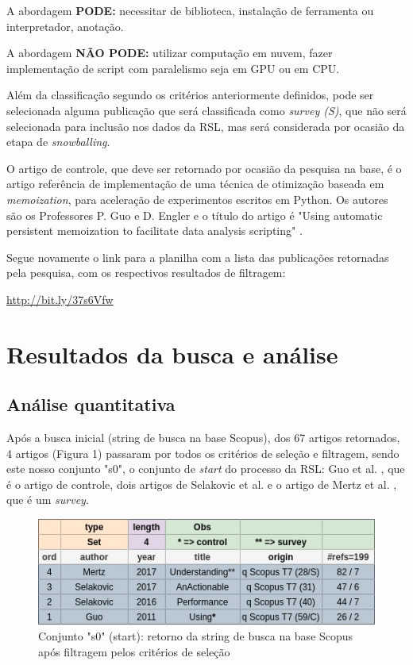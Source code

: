 \documentclass[sigconf]{acmart}
\begin{document}
A abordagem \textbf{PODE:} necessitar de biblioteca, instalação de ferramenta ou interpretador, anotação.

A abordagem \textbf{NÃO PODE:} utilizar computação em nuvem, fazer implementação de script com paralelismo seja em GPU ou em CPU.

Além da classificação segundo os critérios anteriormente definidos, pode ser selecionada alguma publicação que será classificada como \textit{survey (S)}, que não será selecionada para inclusão nos dados da RSL, mas será considerada por ocasião da etapa de \textit{snowballing}.

O artigo de controle, que deve ser retornado por ocasião da pesquisa na base, é o artigo referência de implementação de uma técnica de otimização baseada em \textit{memoization}, para aceleração de experimentos escritos em Python. Os autores são os Professores P. Guo e D. Engler e o título do artigo é "Using automatic persistent memoization to facilitate data analysis scripting" \cite{guo2011using}.

Segue novamente o link para a planilha com a lista das publicações retornadas pela pesquisa, com os respectivos resultados de filtragem:

\url{http://bit.ly/37s6Vfw}


\section{Resultados da busca e análise}
\subsection{Análise quantitativa}
Após a busca inicial (string de busca na base Scopus), dos 67 artigos retornados, 4 artigos (Figura 1) passaram por todos os critérios de seleção e filtragem, sendo este nosso conjunto "s0", o conjunto de \textit{start} do processo da RSL: Guo et al. \cite{guo2011using}, que é o artigo de controle, dois artigos de Selakovic et al. \cite{selakovic2016performance}\cite{selakovic2017actionable} e o artigo de Mertz et al. \cite{mertz2017understanding}, que é um \textit{survey}.

\begin{figure}[H]
  \centering
  \includegraphics[width=\linewidth]{s0}
  \caption{Conjunto "s0" (start): retorno da string de busca na base Scopus após filtragem pelos critérios de seleção}
\end{figure}
\end{document}
